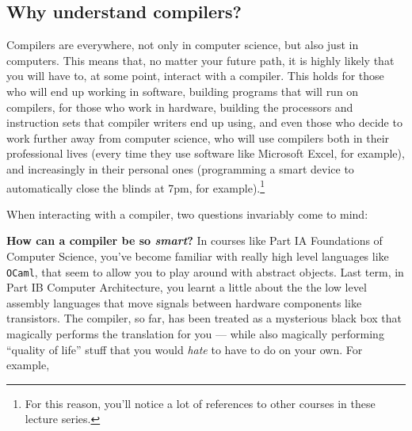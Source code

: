\subsection{Why understand compilers?}
Compilers are everywhere, not only in computer science, but also just in computers. This means that, no matter your future path, it is highly likely that you will have to, at some point, interact with a compiler. This holds for those who will end up working in software, building programs that will run on compilers, for those who work in hardware, building the processors and instruction sets that compiler writers end up using, and even those who decide to work further away from computer science, who will use compilers both in their professional lives (every time they use software like Microsoft Excel, for example), and increasingly in their personal ones (programming a smart device to automatically close the blinds at 7pm, for example).\footnote{For this reason, you'll notice a lot of references to other courses in these lecture series.}

When interacting with a compiler, two questions invariably come to mind:

\textbf{How can a compiler be so \emph{smart}?} In courses like {\sffamily Part IA Foundations of Computer Science}, you've become familiar with really high level languages like \texttt{OCaml}, that seem to allow you to play around with abstract objects. Last term, in {\sffamily Part IB Computer Architecture}, you learnt a little about the the low level assembly languages that move signals between hardware components like transistors. The compiler, so far, has been treated as a mysterious black box that magically performs the translation for you --- while also magically performing ``quality of life'' stuff that you would \emph{hate} to have to do on your own. For example,

